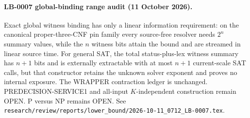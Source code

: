 \paragraph{LB-0007 global-binding range audit (11 October 2026).}
Exact global witness binding has only a linear information requirement: on
the canonical proper-three-CNF pin family every source-free resolver needs
$2^n$ summary values, while the $n$ witness bits attain the bound and are
streamed in linear source time.  For general SAT, the total status-plus-lex
witness summary has $n+1$ bits and is externally extractable with at most
$n+1$ current-scale SAT calls, but that constructor retains the unknown
solver exponent and proves no internal exposure.  The WRAPPER contraction
ledger is unchanged.  PREDECISION-SERVICE1 and all-input $K$-independent
construction remain OPEN.  P versus NP remains OPEN.  See
\texttt{research/review/reports/lower\_bound/2026-10-11\_0712\_LB-0007.tex}.
